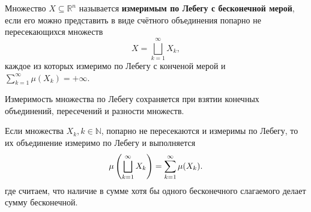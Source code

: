 
\begin{to_def}
    Множество $X \subseteq \mathbb{R}^n$ называется \textbf{измеримым по Лебегу с бесконечной мерой}, если его можно представить в виде счётного объединения попарно не пересекающихся множеств
    $$
        X = \bigsqcup_{k=1}^{\infty} X_k,
    $$
    каждое из которых измеримо по Лебегу с конченой мерой и $\sum_{k=1}^{\infty} \mu (X_k) = + \infty$.

    \label{5.22d}
\end{to_def}


\begin{to_thr}
    Измеримость множества по Лебегу сохраняется при взятии конечных объединений, пересечений и разности множеств.
    \label{5.34t}
\end{to_thr}

\begin{to_thr}
    Если множества $X_k, k \in \mathbb{N}$, попарно не пересекаются и измеримы по Лебегу, то их объединение измеримо по Лебегу и выполняется
    $$
    \mu\left(\bigsqcup_{k=1}^{\infty} X_k\right) = \sum_{k=1}^{\infty} \mu (X_k).
    $$
    где считаем, что наличие в сумме хотя бы одного бесконечного слагаемого делает сумму
    бесконечной.
    \label{5.35t}
\end{to_thr}